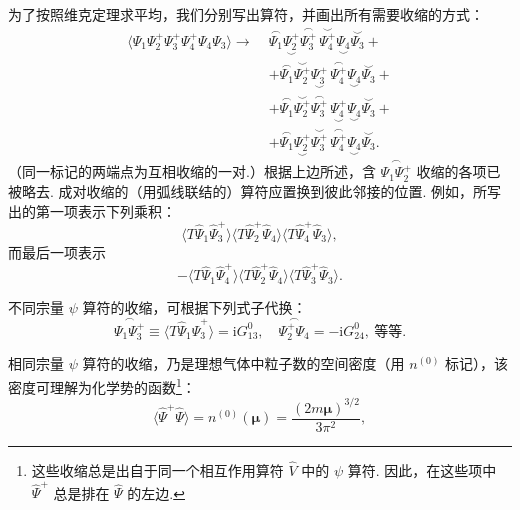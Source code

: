 为了按照维克定理求平均，我们分别写出算符，并画出所有需要收缩的方式：
\begin{equation*}
\begin{aligned}
\langle\Psi_1\Psi^{+}_2\Psi^{+}_3\Psi^{+}_4\Psi_4\Psi_3\rangle\to{}\;&
\overset{\frown}{\Psi_1}\underset{\smile}{\Psi^{+}_2}\overset{\frown}{\Psi^{+}_3}\,\overset{\smile}{\Psi^{+}_4}\underset{\smile}{\Psi_4}\overset{\smile}{\Psi_3}+{}\\
&+\overset{\frown}{\Psi_1}\overset{\smile}{\Psi^{+}_2}\underset{\smile}{\Psi^{+}_3}\,\overset{\frown}{\Psi^{+}_4}\underset{\smile}{\Psi_4}\overset{\smile}{\Psi_3}+\\
&+\overset{\frown}{\Psi_1}\overset{\smile}{\Psi^{+}_2}\overset{\frown}{\Psi^{+}_3}\,\underset{\smile}{\Psi^{+}_4}\underset{\smile}{\Psi_4}\overset{\smile}{\Psi_3}+\\
&+\overset{\frown}{\Psi_1}\underset{\smile}{\Psi^{+}_2}\overset{\smile}{\Psi^{+}_3}\,\overset{\frown}{\Psi^{+}_4}\underset{\smile}{\Psi_4}\overset{\smile}{\Psi_3}.
\end{aligned}
\end{equation*}
（同一标记的两端点为互相收缩的一对.）根据上边所述，含 $\overset{\frown}{\Psi_1\Psi^{+}_2}$ 收缩的各项已被略去. 成对收缩的（用弧线联结的）算符应置换到彼此邻接的位置. 例如，所写出的第一项表示下列乘积：
\begin{equation*}
\langle T\hat\Psi_1\hat\Psi^{+}_3\rangle\langle T\hat\Psi^{+}_2\hat\Psi_4\rangle\langle T\hat\Psi^{+}_4\hat\Psi_3\rangle,
\end{equation*}
而最后一项表示
\begin{equation*}
-\langle T\hat\Psi_1\hat\Psi^{+}_4\rangle\langle T\hat\Psi^{+}_2\hat\Psi_4\rangle\langle T\hat\Psi^{+}_3\hat\Psi_3\rangle.
\end{equation*}

不同宗量 $\psi$ 算符的收缩，可根据下列式子代换：
\begin{equation*}
\overset{\frown}{\Psi_1\Psi^{+}_3}\equiv\langle T\hat\Psi_1\hat\Psi^{+}_3\rangle=\mathrm{i}G^{0}_{13},\quad \overset{\frown}{\Psi^{+}_2\Psi_4}=-\mathrm{i}G^{0}_{24},\ \text{等等.}
\end{equation*}

相同宗量 $\psi$ 算符的收缩，乃是理想气体中粒子数的空间密度（用 $n^{(0)}$ 标记），该密度可理解为化学势的函数\footnote{这些收缩总是出自于同一个相互作用算符 $\hat V$ 中的 $\psi$ 算符. 因此，在这些项中 $\hat\Psi^{+}$ 总是排在 $\hat\Psi$ 的左边.}：
\begin{equation}
\langle\hat\Psi^{+}\hat\Psi\rangle=n^{(0)}(\bm\mu)=\frac{(2m\bm\mu)^{3/2}}{3\pi^2},
\end{equation}

